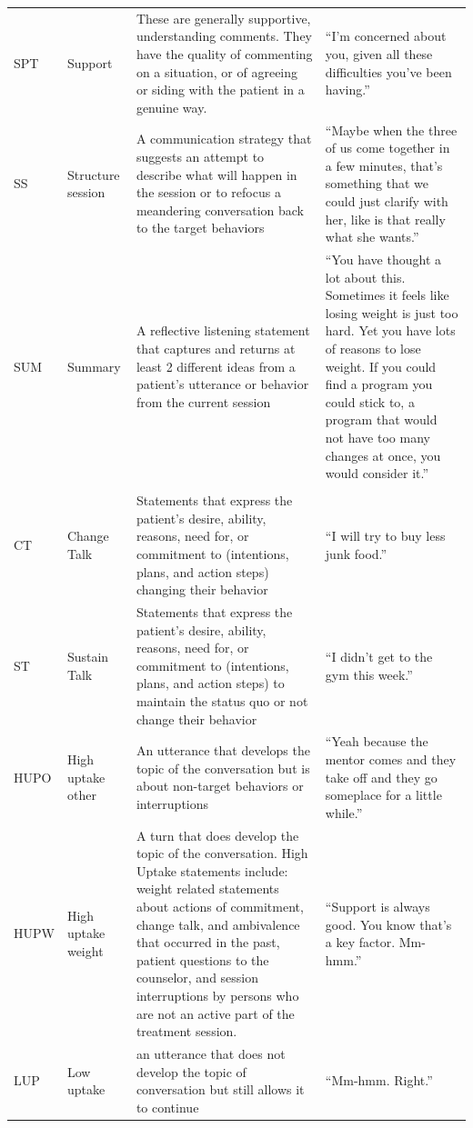 \begin{small}
\begin{longtable}{p{1.3cm}p{2cm}p{5cm}p{4.8cm}}
SPT & Support & These are generally supportive, understanding comments. They have the quality of commenting on a situation, or of agreeing or siding with the patient in a genuine way. & ``I'm concerned about you, given all these difficulties you've been having.''\\
SS & Structure session & A communication strategy that suggests an attempt to describe what will happen in the session or to refocus a meandering conversation back to the target behaviors & ``Maybe when the three of us come together in a few minutes, that’s something that we could just clarify with her, like is that really what she wants.''\\
SUM & Summary & A reflective listening statement that captures and returns at least 2 different ideas from a patient’s utterance or behavior from the current session & ``You have thought a lot about this.  Sometimes it feels like losing weight is just too hard.  Yet you have lots of reasons to lose weight.  If you could find a program you could stick to, a program that would not have too many changes at once, you would consider it.''\\

\rowcolor{lightgraycol}
\noalign{\smallskip}
\multicolumn{4}{l}{\textbf{Patient}} \\
\noalign{\smallskip}
CT & Change Talk & Statements that express the patient’s desire, ability, reasons, need for, or commitment to (intentions, plans, and action steps) changing their behavior & ``I will try to buy less junk food.''\\
ST & Sustain Talk & Statements that express the patient’s desire, ability, reasons, need for, or commitment to (intentions, plans, and action steps) to maintain the status quo or not change their behavior  & ``I didn’t get to the gym this week.''\\
HUPO	 & High uptake other & An utterance that develops the topic of the conversation but is about non-target behaviors or interruptions & ``Yeah because the mentor comes and they take off and they go someplace for a little while.''\\
HUPW & High uptake weight & A turn that does develop the topic of the conversation. High Uptake statements include: weight related statements about actions of commitment, change talk, and ambivalence that occurred in the past, patient questions to the counselor, and session interruptions by persons who are not an active part of the treatment session. & ``Support is always good.  You know that’s a key factor.  Mm-hmm.''\\
LUP & Low uptake  & an utterance that does not develop the topic of conversation but still allows it to continue & ``Mm-hmm.  Right.''\\
\hline
\end{longtable}
\end{small}


